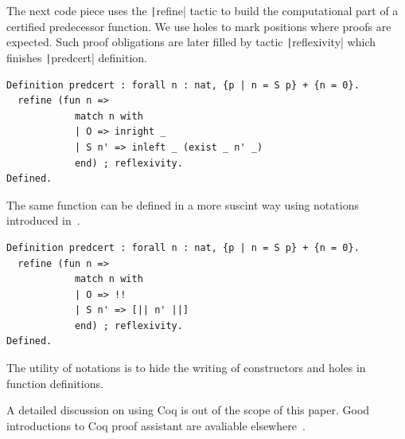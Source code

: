 \documentclass[review]{elsarticle}
\newcommand{\coq}[1]{\texttt|#1|}
\theoremstyle{definition}
\begin{document}
The next code piece uses the \coq{refine} tactic to build the computational part
of a certified predecessor function. We use holes to mark positions where proofs are
expected. Such proof obligations are later filled by tactic \coq{reflexivity} which finishes
\coq{predcert} definition.

\begin{verbatim}
Definition predcert : forall n : nat, {p | n = S p} + {n = 0}.
  refine (fun n =>
            match n with
            | O => inright _
            | S n' => inleft _ (exist _ n' _)
            end) ; reflexivity.
Defined.
\end{verbatim}

The same function can be defined in a more suscint way using notations introduced
in~\cite{Chlipala13}.

\begin{verbatim}
Definition predcert : forall n : nat, {p | n = S p} + {n = 0}.
  refine (fun n =>
            match n with
            | O => !!
            | S n' => [|| n' ||]
            end) ; reflexivity.
Defined.
\end{verbatim}
The utility of notations is to hide the writing of constructors and holes in
function definitions.


A detailed discussion on using Coq is out of the scope of this paper. Good introductions
to Coq proof assistant are avaliable elsewhere~\cite{Bertot2010,Chlipala13}.
\end{document}
